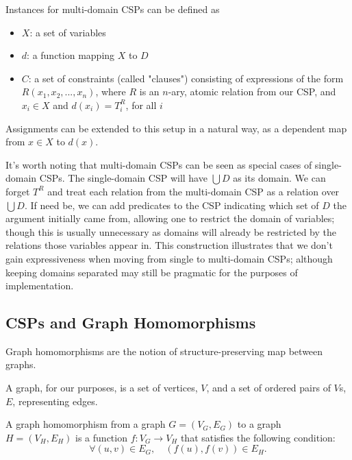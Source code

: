 Instances for multi-domain CSPs can be defined as

\begin{itemize}
  \item $X$: a set of variables
  \item $d$: a function mapping $X$ to $D$
  \item $C$: a set of constraints (called "clauses") consisting of expressions of the form $R(x_1,x_2,...,x_n)$, where $R$ is an $n$-ary, atomic relation from our CSP, and $x_i \in X$ and $d(x_i) = T^R_i$, for all $i$
\end{itemize}

Assignments can be extended to this setup in a natural way, as a dependent map from $x \in X$ to $d(x)$.

It’s worth noting that multi-domain CSPs can be seen as special cases of single-domain CSPs. The single-domain CSP will have $\bigcup D$ as its domain. We can forget $T^R$ and treat each relation from the multi-domain CSP as a relation over $\bigcup D$. If need be, we can add predicates to the CSP indicating which set of $D$ the argument initially came from, allowing one to restrict the domain of variables; though this is usually unnecessary as domains will already be restricted by the relations those variables appear in. This construction illustrates that we don’t gain expressiveness when moving from single to multi-domain CSPs; although keeping domains separated may still be pragmatic for the purposes of implementation.

\subsection{CSPs and Graph Homomorphisms}\label{sec:homomorphism}

Graph homomorphisms are the notion of structure-preserving map between graphs. 

\begin{definition}
A graph, for our purposes, is a set of vertices, $V$, and a set of ordered pairs of $V$s, $E$, representing edges.
\end{definition}

\begin{definition}
A graph homomorphism from a graph $G = (V_G, E_G)$ to a graph $H = (V_H, E_H)$ is a function $f: V_G \rightarrow V_H$ that satisfies the following condition:
\begin{equation}
    \forall (u, v) \in E_G, \quad (f(u), f(v)) \in E_H.    
\end{equation}    
\end{definition}

